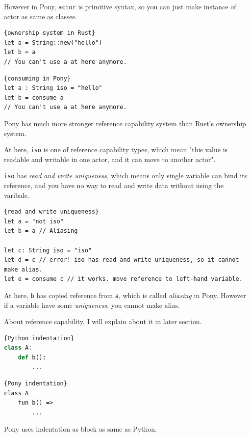 \documentclass{article}
\begin{document}
\begin{multicols}{2}
However in Pony, \texttt{actor} is primitive syntax, so you can just make instance of actor as same as classes. \\





\begin{lstlisting}{ownership system in Rust}
let a = String::new("hello")
let b = a
// You can't use a at here anymore.
\end{lstlisting}

\begin{lstlisting}{consuming in Pony}
let a : String iso = "hello"
let b = consume a
// You can't use a at here anymore.
\end{lstlisting}

Pony has much more stronger reference capability system than Rust's ownership system. 

At here, \texttt{iso} is one of reference capability types, which mean "this value is readable and writable in one actor, and it can move to another actor".

\texttt{iso} has \textit{read and write uniqueness}, which means only single variable can bind its reference, and you have no way to read and write data without using the varibale.

\begin{lstlisting}{read and write uniqueness}
let a = "not iso"
let b = a // Aliasing

let c: String iso = "iso"
let d = c // error! iso has read and write uniqueness, so it cannot make alias.
let e = consume c // it works. move reference to left-hand variable. 
\end{lstlisting}
At here, \texttt{b} has copied reference from \texttt{a}, which is called \textit{aliasing} in Pony. However if a variable have some \textit{uniqueness}, you cannot make alias.

About reference capability, I will explain about it in later section.
\\



\begin{lstlisting}[language=Python]{Python indentation}
class A:
	def b():
		...
\end{lstlisting}

\begin{lstlisting}{Pony indentation}
class A
	fun b() =>
		...
\end{lstlisting}


Pony uses indentation as block as same as Python.\\


\end{multicols}
\end{document}
